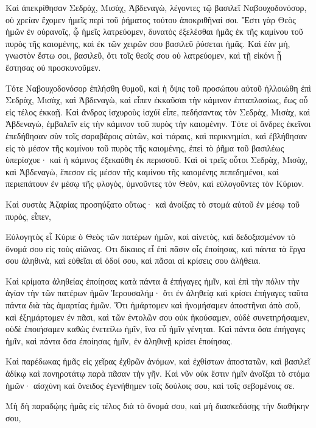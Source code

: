 {\par }{\PP {}Καὶ ἀπεκρίθησαν Σεδρὰχ, Μισὰχ, Ἀβδεναγὼ, λέγοντες τῷ βασιλεῖ Ναβουχοδονόσορ, οὐ χρείαν ἔχομεν ἡμεῖς περὶ τοῦ ῥήματος τούτου ἀποκριθῆναί σοι.
Ἔστι γὰρ Θεὸς ἡμῶν ἐν οὐρανοῖς, ᾧ ἡμεῖς λατρεύομεν, δυνατὸς ἐξελέσθαι ἡμᾶς ἐκ τῆς καμίνου τοῦ πυρὸς τῆς καιομένης, καὶ ἐκ τῶν χειρῶν σου βασιλεῦ ῥύσεται ἡμᾶς.
Καὶ ἐὰν μὴ, γνωστὸν ἔστω σοι, βασιλεῦ, ὅτι τοῖς θεοῖς σου οὐ λατρεύομεν, καὶ τῇ εἰκόνι ᾗ ἔστησας οὐ προσκυνοῦμεν.
\par }{\PP {}Τότε Ναβουχοδονόσορ ἐπλήσθη θυμοῦ, καὶ ἡ ὄψις τοῦ προσώπου αὐτοῦ ἠλλοιώθη ἐπὶ Σεδρὰχ, Μισὰχ, καὶ Ἀβδεναγὼ, καὶ εἶπεν ἐκκαῦσαι τὴν κάμινον ἐπταπλασίως, ἕως οὗ εἰς τέλος ἐκκαῇ.
Καὶ ἄνδρας ἰσχυροὺς ἰσχύϊ εἶπε, πεδήσαντας τὸν Σεδρὰχ, Μισὰχ, καὶ Ἀβδεναγὼ, ἐμβαλεῖν εἰς τὴν κάμινον τοῦ πυρὸς τὴν καιομένην.
Τότε οἱ ἄνδρες ἐκεῖνοι ἐπεδήθησαν σὺν τοῖς σαραβάροις αὐτῶν, καὶ τιάραις, καὶ περικνημίσι, καὶ ἐβλήθησαν εἰς τὸ μέσον τῆς καμίνου τοῦ πυρὸς τῆς καιομένης,
ἐπεὶ τὸ ῥῆμα τοῦ βασιλέως ὑπερίσχυε· καὶ ἡ κάμινος ἐξεκαύθη ἐκ περισσοῦ.
Καὶ οἱ τρεῖς οὗτοι Σεδρὰχ, Μισὰχ, καὶ Ἀβδεναγὼ, ἔπεσον εἰς μέσον τῆς καμίνου τῆς καιομένης πεπεδημένοι,
καὶ περιεπάτουν ἐν μέσῳ τῆς φλογὸς, ὑμνοῦντες τὸν Θεὸν, καὶ εὐλογοῦντες τὸν Κύριον.
\par }{\PP {}Καὶ συστὰς Ἀζαρίας προσηύξατο οὕτως· καὶ ἀνοίξας τὸ στομά αὐτοῦ ἐν μέσῳ τοῦ πυρὸς, εἶπεν,
\par }{\PP {}Εὐλογητὸς εἶ Κύριε ὁ Θεὸς τῶν πατέρων ἡμῶν, καὶ αἰνετὸς, καὶ δεδοξασμένον τὸ ὄνομά σου εἰς τοὺς αἰῶνας.
Οτι δίκαιος εἶ ἐπὶ πᾶσιν οἶς ἐποίησας, καὶ πάντα τὰ ἔργα σου ἀληθινὰ, καὶ εὐθεῖαι αἱ ὁδοί σου, καὶ πᾶσαι αἱ κρίσεις σου ἀλήθεια.
\par }{\PP {}Καὶ κρίματα ἀληθείας ἐποίησας κατὰ πάντα ἃ ἐπήγαγες ἡμῖν, καὶ ἐπὶ τὴν πόλιν τὴν ἁγίαν τὴν τῶν πατέρων ἡμῶν Ἱερουσαλήμ· ὅτι ἐν ἀληθείᾳ καὶ κρίσει ἐπήγαγες ταῦτα πάντα διὰ τὰς ἁμαρτίας ἡμῶν.
Ὅτι ἡμάρτομεν καὶ ἠνομήσαμεν ἀποστῆναι ἀπὸ σοῦ, καὶ ἐξημάρτομεν ἐν πᾶσι, καὶ τῶν ἐντολῶν σου οὐκ ἠκούσαμεν,
οὐδὲ συνετηρήσαμεν, οὐδὲ ἐποιήσαμεν καθὼς ἐνετείλω ἡμῖν, ἵνα εὖ ἡμῖν γένηται.
Καὶ πάντα ὅσα ἐπήγαγες ἡμῖν, καὶ πάντα ὅσα ἐποίησας ἡμῖν, ἐν ἀληθινῇ κρίσει ἐποίησας.
\par }{\PP {}Καὶ παρέδωκας ἡμᾶς εἰς χεῖρας ἐχθρῶν ἀνόμων, καὶ ἐχθίστων ἀποστατῶν, καὶ βασιλεῖ ἀδίκῳ καὶ πονηροτάτῳ παρὰ πᾶσαν τὴν γῆν.
Καὶ νῦν οὐκ ἔστιν ἡμῖν ἀνοῖξαι τὸ στόμα ἡμῶν· αἰσχύνη καὶ ὄνειδος ἐγενήθημεν τοῖς δούλοις σου, καὶ τοῖς σεβομένοις σε.
\par }{\PP {}Μὴ δὴ παραδῴης ἡμᾶς εἰς τέλος διὰ τὸ ὄνομά σου, καὶ μὴ διασκεδάσῃς τὴν διαθήκην σου,
}
